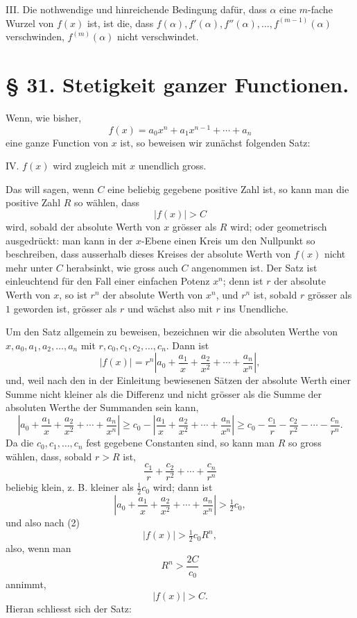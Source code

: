 \documentclass[11pt]{article}
\begin{document}
\medskip
\noindent III. Die nothwendige und hinreichende Bedingung dafür, dass $\alpha$ eine $m$-fache Wurzel von $f(x)$ ist, ist die, dass $f(\alpha),f'(\alpha),f''(\alpha),\ldots,f^{(m-1)}(\alpha)$ verschwinden, $f^{(m)}(\alpha)$ nicht verschwindet.

\section*{§ 31. Stetigkeit ganzer Functionen.}

Wenn, wie bisher,
\[
 f(x)=a_0x^n+a_1x^{n-1}+\cdots+a_n
\]
eine ganze Function von $x$ ist, so beweisen wir zunächst folgenden Satz:

\medskip
\noindent IV. $f(x)$ wird zugleich mit $x$ unendlich gross.
\medskip

Das will sagen, wenn $C$ eine beliebig gegebene positive Zahl ist, so kann man die positive Zahl $R$ so wählen, dass
\[
 |f(x)|>C
\]
wird, sobald der absolute Werth von $x$ grösser als $R$ wird; oder geometrisch ausgedrückt: man kann in der $x$-Ebene einen Kreis um den Nullpunkt so beschreiben, dass ausserhalb dieses Kreises der absolute Werth von $f(x)$ nicht mehr unter $C$ herabsinkt, wie gross auch $C$ angenommen ist. Der Satz ist einleuchtend für den Fall einer einfachen Potenz $x^n$; denn ist $r$ der absolute Werth von $x$, so ist $r^n$ der absolute Werth von $x^n$, und $r^n$ ist, sobald $r$ grösser als $1$ geworden ist, grösser als $r$ und wächst also mit $r$ ins Unendliche.

Um den Satz allgemein zu beweisen, bezeichnen wir die absoluten Werthe von $x,a_0,a_1,a_2,\ldots,a_n$ mit $r,c_0,c_1,c_2,\ldots,c_n$. Dann ist
\begin{equation}
 |f(x)|=r^n\left|a_0+\frac{a_1}{x}+\frac{a_2}{x^2}+\cdots+\frac{a_n}{x^n}\right|,
\tag{2}
\end{equation}
und, weil nach den in der Einleitung bewiesenen Sätzen der absolute Werth einer Summe nicht kleiner als die Differenz und nicht grösser als die Summe der absoluten Werthe der Summanden sein kann,
\[
\left|a_0+\frac{a_1}{x}+\frac{a_2}{x^2}+\cdots+\frac{a_n}{x^n}\right|
\ge c_0-\left|\frac{a_1}{x}+\frac{a_2}{x^2}+\cdots+\frac{a_n}{x^n}\right|
\ge c_0-\frac{c_1}{r}-\frac{c_2}{r^2}-\cdots-\frac{c_n}{r^n}.
\]
Da die $c_0,c_1,\ldots,c_n$ fest gegebene Constanten sind, so kann man $R$ so gross wählen, dass, sobald $r>R$ ist,
\[
 \frac{c_1}{r}+\frac{c_2}{r^2}+\cdots+\frac{c_n}{r^n}
\]
beliebig klein, z. B. kleiner als $\tfrac12c_0$ wird; dann ist
\[
 \left|a_0+\frac{a_1}{x}+\frac{a_2}{x^2}+\cdots+\frac{a_n}{x^n}\right|>\tfrac12c_0,
\]
und also nach (2)
\[
 |f(x)|>\tfrac12c_0R^n,
\]
also, wenn man
\begin{equation}
 R^n>\frac{2C}{c_0}
\tag{3}
\end{equation}
annimmt,
\[
 |f(x)|>C.
\]
Hieran schliesst sich der Satz:
\end{document}
